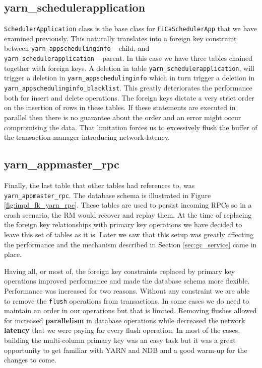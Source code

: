 \subsection{yarn\_schedulerapplication}
\label{ssec:impl_fk_schedulerapp}
\texttt{SchedulerApplication} class is the base class for
\texttt{FiCaSchedulerApp} that we have examined previously. This
naturally translates into a foreign key constraint between
\texttt{yarn\_appschedulinginfo} -- child, and \\
\texttt{yarn\_schedulerapplication} -- parent. In this case we have
three tables chained together with foreign keys. A deletion in table 
\texttt{yarn\_schedulerapplication}, will trigger a deletion in
\texttt{yarn\_appschedulinginfo} which in turn trigger a deletion in
\texttt{yarn\_appschedulinginfo\_blacklist}. This greatly deteriorates
the performance both for insert and delete operations. The foreign
keys dictate a very strict order on the insertion of rows in these
tables. If these statements are executed in parallel then there is no
guarantee about the order and an error might occur compromising the data. That
limitation forces us to excessively flush the buffer of the
transaction manager introducing network latency.

\subsection{yarn\_appmaster\_rpc}
\label{ssec:impl_fk_appmaster_rpc}
Finally, the last table that other tables had references to, was
\texttt{yarn\_appmaster\_rpc}. The database schema is illustrated in
Figure \ref{fig:impl_fk_yarn_rpc}. These tables are used to persist
incoming RPCs so in a crash scenario, the RM would recover and replay
them. At the time of replacing the foreign key relationships with
primary key operations we have decided to leave this set of tables as
it is. Later we saw that this setup was greatly affecting the
performance and the mechanism described in Section
\ref{sec:gc_service} came in place.

Having all, or most of, the foreign key constraints replaced by
primary key operations improved performance and made the database
schema more flexible. Performance was increased for two
reasons. Without any constraint we are able to remove the
\texttt{flush} operations from transactions. In some cases we do need
to maintain an order in our operations but that is limited. Removing
flushes allowed for increased \textbf{parallelism} in database operations while decreased the
network \textbf{latency} that we were paying for every flush
operation. In most of the cases, building the multi-column primary key
was an easy task but it was a great opportunity to get familiar with
YARN and NDB and a good warm-up for the changes to come.
